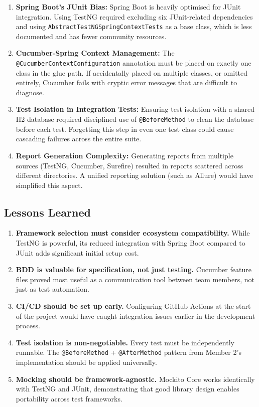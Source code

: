 \documentclass[12pt,a4paper]{article}
\begin{document}
\begin{enumerate}
    \item \textbf{Spring Boot's JUnit Bias:} Spring Boot is heavily optimised for JUnit integration. Using TestNG required excluding six JUnit-related dependencies and using \texttt{AbstractTestNGSpringContextTests} as a base class, which is less documented and has fewer community resources.

    \item \textbf{Cucumber-Spring Context Management:} The \texttt{@CucumberContextConfiguration} annotation must be placed on exactly one class in the glue path. If accidentally placed on multiple classes, or omitted entirely, Cucumber fails with cryptic error messages that are difficult to diagnose.

    \item \textbf{Test Isolation in Integration Tests:} Ensuring test isolation with a shared H2 database required disciplined use of \texttt{@BeforeMethod} to clean the database before each test. Forgetting this step in even one test class could cause cascading failures across the entire suite.

    \item \textbf{Report Generation Complexity:} Generating reports from multiple sources (TestNG, Cucumber, Surefire) resulted in reports scattered across different directories. A unified reporting solution (such as Allure) would have simplified this aspect.
\end{enumerate}

\subsection{Lessons Learned}

\begin{tcolorbox}[insightbox, title=Key Takeaways]
\begin{enumerate}[nosep]
    \item \textbf{Framework selection must consider ecosystem compatibility.} While TestNG is powerful, its reduced integration with Spring Boot compared to JUnit adds significant initial setup cost.
    \item \textbf{BDD is valuable for specification, not just testing.} Cucumber feature files proved most useful as a communication tool between team members, not just as test automation.
    \item \textbf{CI/CD should be set up early.} Configuring GitHub Actions at the start of the project would have caught integration issues earlier in the development process.
    \item \textbf{Test isolation is non-negotiable.} Every test must be independently runnable. The \texttt{@BeforeMethod} + \texttt{@AfterMethod} pattern from Member 2's implementation should be applied universally.
    \item \textbf{Mocking should be framework-agnostic.} Mockito Core works identically with TestNG and JUnit, demonstrating that good library design enables portability across test frameworks.
\end{enumerate}
\end{tcolorbox}
\end{document}
